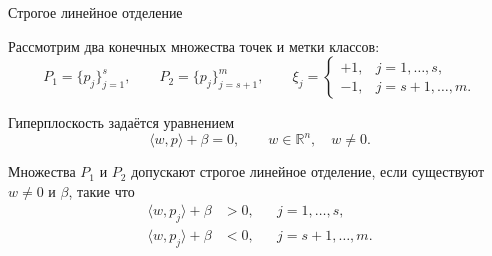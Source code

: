 \SPBGContentSlide
  {Строгое линейное отделение}
  {%
    \SmallBody
    Рассмотрим два конечных множества точек и метки классов:
    \[
      P_1=\{p_j\}_{j=1}^{s},
      \qquad
      P_2=\{p_j\}_{j=s+1}^{m},
      \qquad
      \xi_j=\begin{cases}
        +1,& j=1,\ldots,s,\\
        -1,& j=s+1,\ldots,m.
      \end{cases}
    \]

    Гиперплоскость задаётся уравнением
    \[
      \langle w,p\rangle+\beta=0,
      \qquad
      w\in\mathbb{R}^{n},\quad w\neq0.
    \]

    Множества \(P_1\) и \(P_2\) допускают строгое линейное отделение,
    если существуют \(w\neq0\) и \(\beta\), такие что
    \[
      \begin{aligned}
        \langle w,p_j\rangle+\beta&>0,
        &&j=1,\ldots,s,\\
        \langle w,p_j\rangle+\beta&<0,
        &&j=s+1,\ldots,m.
      \end{aligned}
    \]

  }
